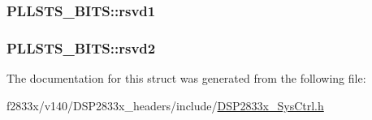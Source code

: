 \subsubsection[{rsvd1}]{ P\+L\+L\+S\+T\+S\+\_\+\+B\+I\+T\+S\+::rsvd1}\label{struct_p_l_l_s_t_s___b_i_t_s_a9fc55d573939747d85d2663590ca8387}
\hypertarget{struct_p_l_l_s_t_s___b_i_t_s_ab59888f251e1f1717d32526bf7d30540}{}
\subsubsection[{rsvd2}]{ P\+L\+L\+S\+T\+S\+\_\+\+B\+I\+T\+S\+::rsvd2}\label{struct_p_l_l_s_t_s___b_i_t_s_ab59888f251e1f1717d32526bf7d30540}


The documentation for this struct was generated from the following file\+:\begin{DoxyCompactItemize}
\item 
f2833x/v140/\+D\+S\+P2833x\+\_\+headers/include/\hyperlink{_d_s_p2833x___sys_ctrl_8h}{D\+S\+P2833x\+\_\+\+Sys\+Ctrl.\+h}\end{DoxyCompactItemize}
